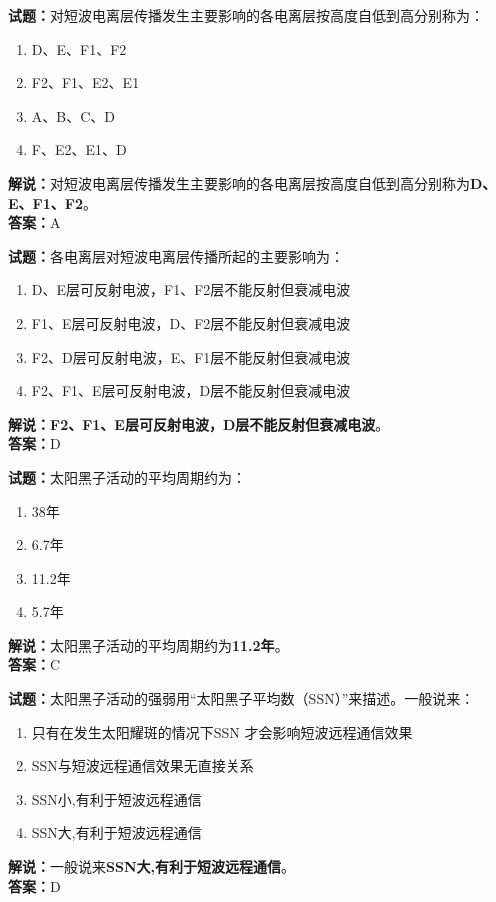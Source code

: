 \documentclass{ctexbook}
\begin{document}
\bigskip


\noindent\textbf{试题：}对短波电离层传播发生主要影响的各电离层按高度自低到高分别称为：
\begin{enumerate}[leftmargin=3em]
\item D、E、F1、F2
\item F2、F1、E2、E1
\item A、B、C、D
\item F、E2、E1、D
\end{enumerate}
\noindent\textbf{解说：}对短波电离层传播发生主要影响的各电离层按高度自低到高分别称为\textbf{D、E、F1、F2}。\\\noindent\textbf{答案：}A



\bigskip


\noindent\textbf{试题：}各电离层对短波电离层传播所起的主要影响为：
\begin{enumerate}[leftmargin=3em]
\item D、E层可反射电波，F1、F2层不能反射但衰减电波
\item F1、E层可反射电波，D、F2层不能反射但衰减电波
\item F2、D层可反射电波，E、F1层不能反射但衰减电波
\item F2、F1、E层可反射电波，D层不能反射但衰减电波
\end{enumerate}
\noindent\textbf{解说：}\textbf{F2、F1、E层可反射电波，D层不能反射但衰减电波}。\\\noindent\textbf{答案：}D



\bigskip


\noindent\textbf{试题：}太阳黑子活动的平均周期约为：
\begin{enumerate}[leftmargin=3em]
\item 38年
\item 6.7年
\item 11.2年
\item 5.7年
\end{enumerate}
\noindent\textbf{解说：}太阳黑子活动的平均周期约为\textbf{11.2年}。\\\noindent\textbf{答案：}C


\bigskip


\noindent\textbf{试题：}太阳黑子活动的强弱用“太阳黑子平均数（SSN）”来描述。一般说来：
\begin{enumerate}[leftmargin=3em]
\item 只有在发生太阳耀斑的情况下SSN 才会影响短波远程通信效果
\item SSN与短波远程通信效果无直接关系
\item SSN小,有利于短波远程通信
\item SSN大,有利于短波远程通信
\end{enumerate}
\noindent\textbf{解说：}一般说来\textbf{SSN大,有利于短波远程通信}。\\\noindent\textbf{答案：}D
\end{document}
